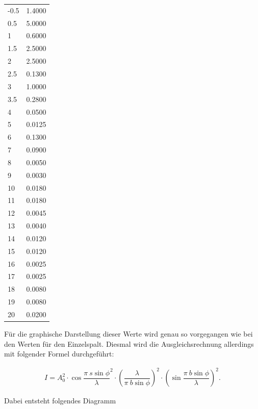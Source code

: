 \begin{minipage}{\linewidth}
\begin{table}[H]
\begin{tabular}{ll}
        -0.5 &   1.4000   \\ 
        0.5  &   5.0000   \\ 
        1    &   0.6000    \\ 
        1.5  &   2.5000   \\ 
        2    &   2.5000  \\ 
        2.5  &   0.1300 \\ 
        3    &   1.0000  \\ 
        3.5  &   0.2800 \\ 
        4    &   0.0500  \\ 
        5    &   0.0125  \\ 
        6    &   0.1300  \\ 
        7    &   0.0900 \\ 
        8    &   0.0050 \\ 
        9    &   0.0030  \\ 
        10   &   0.0180  \\ 
        11   &   0.0180  \\ 
        12   &   0.0045 \\ 
        13   &   0.0040 \\ 
        14   &   0.0120  \\ 
        15   &   0.0120  \\ 
        16   &   0.0025 \\ 
        17   &   0.0025 \\ 
        18   &   0.0080  \\ 
        19   &   0.0080 \\ 
        20   &   0.0200    \\ 
        \bottomrule   
    \end{tabular}
    
    \label{tab:2}
\end{table}
\end{minipage}

Für die graphische Darstellung dieser Werte wird genau so vorgegangen wie bei den Werten für den Einzelspalt. Diesmal wird die Ausgleichsrechnung allerdings mit folgender Formel durchgeführt: 

\begin{align*}
    I= A_0^2\cdot \cos{\dfrac{\pi\ s \sin{\phi}}{\lambda}}^2 \cdot
    (\dfrac{\lambda}{\pi \ b \sin{\phi}})^2 \cdot (\sin{\dfrac{\pi\ b \sin{\phi}}{\lambda}})^2.
\end{align*}

Dabei entsteht folgendes Diagramm

